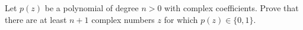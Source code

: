 Let \(p(z)\) be a polynomial of degree \(n>0\) with complex coefficients. Prove that there are at least \(n+1\) complex numbers \(z\) for which \(p(z)\in \{0,1\}\).